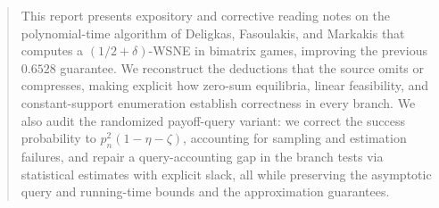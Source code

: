 \begin{abstract}
This report presents expository and corrective reading notes on the polynomial-time algorithm of Deligkas, Fasoulakis, and Markakis that computes a \((1/2+\delta)\)-WSNE in bimatrix games, improving the previous \(0.6528\) guarantee. We reconstruct the deductions that the source omits or compresses, making explicit how zero-sum equilibria, linear feasibility, and constant-support enumeration establish correctness in every branch. We also audit the randomized payoff-query variant: we correct the success probability to \(p_n^2(1-\eta-\zeta)\), accounting for sampling and estimation failures, and repair a query-accounting gap in the branch tests via statistical estimates with explicit slack, all while preserving the asymptotic query and running-time bounds and the approximation guarantees.
\end{abstract}
